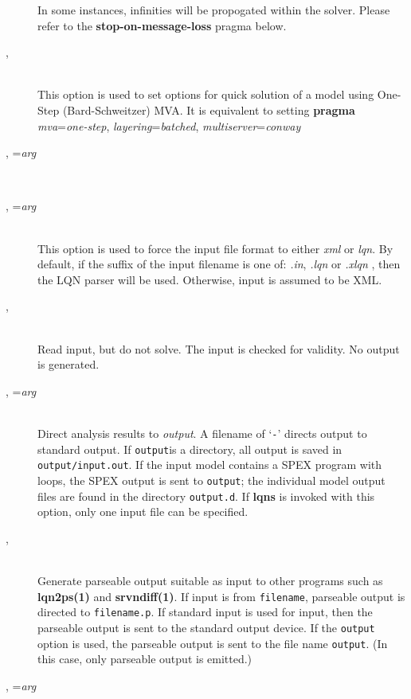 \begin{description}
In some instances, infinities  will be propogated within the solver.  Please refer to the
\textbf{stop-on-message-loss} pragma below.
\item[\flag{f}{}, \longopt{fast}]~\\
This option is used to set options for quick solution of a model using One-Step (Bard-Schweitzer) MVA.
It is equivalent to setting \textbf{pragma} \emph{mva}=\emph{one-step}, \emph{layering}=\emph{batched}, \emph{multiserver}=\emph{conway}
\item[\flag{H}{}, \longopt{help}=\emph{arg}]~\\
\item[\flag{I}{}, \longopt{input-format}=\emph{arg}]~\\
This option is used to force the input file format to either \emph{xml} or \emph{lqn}.
By default, if the suffix of the input filename is one of: \emph{.in}, \emph{.lqn} or \emph{.xlqn}
, then the LQN parser will be used.  Otherwise, input is assumed to be XML.
\item[\flag{n}{}, \longopt{no-execute}]~\\
Read input, but do not solve.  The input is checked for validity.  
No output is generated.
\item[\flag{o}{}, \longopt{output}=\emph{arg}]~\\
Direct analysis results to \emph{output}.  A filename of `\texttt{-}'
directs output to standard output.  If \texttt{output}is a directory, all output is saved in \texttt{output/input.out}. If the input model contains a SPEX program with loops, the SPEX output is sent to \texttt{output}; the individual model output files are found in the directory \texttt{output.d}. If \textbf{lqns} is invoked with this
option, only one input file can be specified.
\item[\flag{p}{}, \longopt{parseable}]~\\
Generate parseable output suitable as input to other programs such as
\textbf{lqn2ps(1)} and \textbf{srvndiff(1)}.  If input is from
\texttt{filename}, parseable output is directed to \texttt{filename.p}.
If standard input is used for input, then the parseable output is sent
to the standard output device.  If the \texttt{output} option is used, the
parseable output is sent to the file name \texttt{output}.
(In this case, only parseable output is emitted.)
\item[\flag{P}{}, \longopt{pragma}=\emph{arg}]~\\

\end{description}
